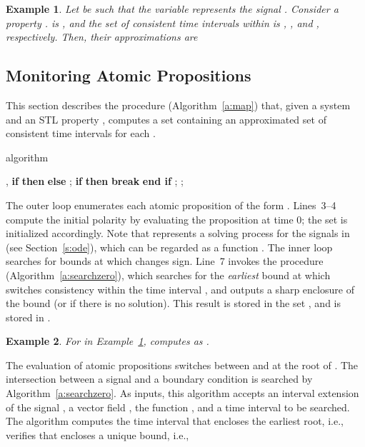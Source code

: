 \documentclass[paper]{ieice}
\newtheorem{example}{Example}
\begin{document}
\begin{example} \label{ex:approx}
	Let  be  such that
	the variable  represents the signal .
	Consider a property
.
 is , and 
	the set of consistent time intervals within  is
	, 
	, and
	, respectively.
	Then, their approximations are
	
\end{example}


\subsection{Monitoring Atomic Propositions}
\label{s:method:map}

This section describes the  procedure (Algorithm~\ref{a:map}) that,
given a system  and an STL property , computes a set  containing an approximated set  of consistent time intervals for each .

\begin{algorithm}[t]
\caption{ algorithm}
\label{a:map}
\begin{algorithmic}[1]
  \REQUIRE , 
  \ENSURE 
\STATE 
  \FOR{}\STATE 
  \STATE \textbf{if}  \textbf{then}  \textbf{else} 
  \STATE ; \quad 
  \LOOP
  \STATE 
  \STATE \textbf{if}  \textbf{then} \textbf{break} \textbf{end if}
  \STATE 
  ; \quad
  ; \quad 
  \ENDLOOP
  \STATE 
  \ENDFOR

  \vspace{.5em}
  \RETURN 
\end{algorithmic}
\end{algorithm}

The outer loop enumerates each atomic proposition  of the form . Lines~3--4 compute the initial polarity by evaluating the proposition at time 0; the set  is initialized accordingly.
Note that  represents a solving process for the signals in  (see Section~\ref{s:ode}), which can be regarded as a function .
The inner loop searches for bounds at which  changes sign.
Line~7 invokes the  procedure (Algorithm~\ref{a:searchzero}), which searches for the \emph{earliest} bound at which  switches consistency within the time interval , and outputs a sharp enclosure of the bound (or  if there is no solution).
This result is stored in the set , and  is stored in .


\begin{example}
	For  in Example~\ref{ex:approx},  computes
	 as .
\end{example}



The evaluation of atomic propositions  switches between  and  at the root of .
The intersection between a signal  and a boundary condition  is searched by Algorithm~\ref{a:searchzero}.
As inputs, this algorithm accepts an interval extension of the signal , a vector field , the function , and a time interval  to be searched.
The algorithm computes the time interval  that encloses the earliest root, i.e., 
 verifies that  encloses a unique bound, i.e.,
\end{document}
